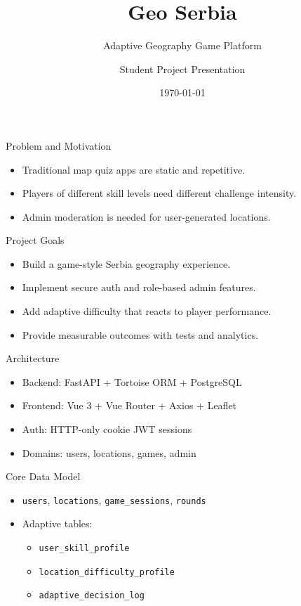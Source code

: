 \documentclass[aspectratio=169]{beamer}
\title{Geo Serbia}
\subtitle{Adaptive Geography Game Platform}
\author{Student Project Presentation}
\date{\today}
\begin{document}
\begin{frame}
  \titlepage
\end{frame}

\begin{frame}{Problem and Motivation}
  \begin{itemize}
    \item Traditional map quiz apps are static and repetitive.
    \item Players of different skill levels need different challenge intensity.
    \item Admin moderation is needed for user-generated locations.
  \end{itemize}
\end{frame}

\begin{frame}{Project Goals}
  \begin{itemize}
    \item Build a game-style Serbia geography experience.
    \item Implement secure auth and role-based admin features.
    \item Add adaptive difficulty that reacts to player performance.
    \item Provide measurable outcomes with tests and analytics.
  \end{itemize}
\end{frame}

\begin{frame}{Architecture}
  \begin{itemize}
    \item Backend: FastAPI + Tortoise ORM + PostgreSQL
    \item Frontend: Vue 3 + Vue Router + Axios + Leaflet
    \item Auth: HTTP-only cookie JWT sessions
    \item Domains: users, locations, games, admin
  \end{itemize}
\end{frame}

\begin{frame}{Core Data Model}
  \begin{itemize}
    \item \texttt{users}, \texttt{locations}, \texttt{game\_sessions}, \texttt{rounds}
    \item Adaptive tables:
    \begin{itemize}
      \item \texttt{user\_skill\_profile}
      \item \texttt{location\_difficulty\_profile}
      \item \texttt{adaptive\_decision\_log}
    \end{itemize}
  \end{itemize}
\end{frame}
\end{document}
